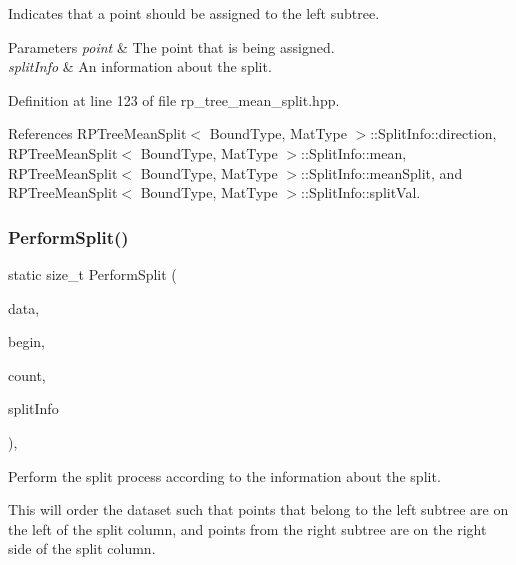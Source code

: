 Indicates that a point should be assigned to the left subtree. 


\begin{DoxyParams}{Parameters}
{\em point} & The point that is being assigned. \\
\hline
{\em split\+Info} & An information about the split. \\
\hline
\end{DoxyParams}


Definition at line 123 of file rp\+\_\+tree\+\_\+mean\+\_\+split.\+hpp.



References R\+P\+Tree\+Mean\+Split$<$ Bound\+Type, Mat\+Type $>$\+::\+Split\+Info\+::direction, R\+P\+Tree\+Mean\+Split$<$ Bound\+Type, Mat\+Type $>$\+::\+Split\+Info\+::mean, R\+P\+Tree\+Mean\+Split$<$ Bound\+Type, Mat\+Type $>$\+::\+Split\+Info\+::mean\+Split, and R\+P\+Tree\+Mean\+Split$<$ Bound\+Type, Mat\+Type $>$\+::\+Split\+Info\+::split\+Val.

\mbox{\label{classmlpack_1_1tree_1_1RPTreeMeanSplit_aace8240352cb3ea61c975987b91a80a6}} 
\subsubsection{Perform\+Split()\hspace{0.1cm}{\footnotesize\ttfamily [1/2]}}
{\footnotesize\ttfamily static size\+\_\+t Perform\+Split (\begin{DoxyParamCaption}\item[{Mat\+Type \&}]{data,  }\item[{const size\+\_\+t}]{begin,  }\item[{const size\+\_\+t}]{count,  }\item[{const \textbf{ Split\+Info} \&}]{split\+Info }\end{DoxyParamCaption})\hspace{0.3cm}{\ttfamily [inline]}, {\ttfamily [static]}}



Perform the split process according to the information about the split. 

This will order the dataset such that points that belong to the left subtree are on the left of the split column, and points from the right subtree are on the right side of the split column.


